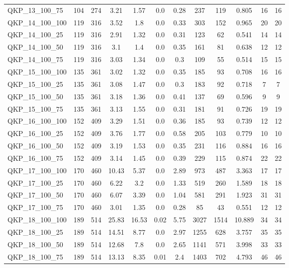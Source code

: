 \begin{table}[!h]
{\begin{tabular}{lccccccccccc}
QKP\_13\_100\_75 & 104 & 274 & 3.21 & 1.57 & 0.0 & 0.28 & 237 & 119 & 0.805 & 16 & 16\\
QKP\_14\_100\_100 & 119 & 316 & 3.52 & 1.8 & 0.0 & 0.33 & 303 & 152 & 0.965 & 20 & 20\\
QKP\_14\_100\_25 & 119 & 316 & 2.91 & 1.32 & 0.0 & 0.31 & 123 & 62 & 0.541 & 14 & 14\\
QKP\_14\_100\_50 & 119 & 316 & 3.1 & 1.4 & 0.0 & 0.35 & 161 & 81 & 0.638 & 12 & 12\\
QKP\_14\_100\_75 & 119 & 316 & 3.03 & 1.34 & 0.0 & 0.3 & 109 & 55 & 0.514 & 15 & 15\\
QKP\_15\_100\_100 & 135 & 361 & 3.02 & 1.32 & 0.0 & 0.35 & 185 & 93 & 0.708 & 16 & 16\\
QKP\_15\_100\_25 & 135 & 361 & 3.08 & 1.47 & 0.0 & 0.3 & 183 & 92 & 0.718 & 7 & 7\\
QKP\_15\_100\_50 & 135 & 361 & 3.18 & 1.36 & 0.0 & 0.41 & 137 & 69 & 0.596 & 9 & 9\\
QKP\_15\_100\_75 & 135 & 361 & 3.13 & 1.55 & 0.0 & 0.31 & 181 & 91 & 0.726 & 19 & 19\\
QKP\_16\_100\_100 & 152 & 409 & 3.29 & 1.51 & 0.0 & 0.36 & 185 & 93 & 0.739 & 12 & 12\\
QKP\_16\_100\_25 & 152 & 409 & 3.76 & 1.77 & 0.0 & 0.58 & 205 & 103 & 0.779 & 10 & 10\\
QKP\_16\_100\_50 & 152 & 409 & 3.19 & 1.53 & 0.0 & 0.35 & 231 & 116 & 0.884 & 16 & 16\\
QKP\_16\_100\_75 & 152 & 409 & 3.14 & 1.45 & 0.0 & 0.39 & 229 & 115 & 0.874 & 22 & 22\\
QKP\_17\_100\_100 & 170 & 460 & 10.43 & 5.37 & 0.0 & 2.89 & 973 & 487 & 3.363 & 17 & 17\\
QKP\_17\_100\_25 & 170 & 460 & 6.22 & 3.2 & 0.0 & 1.33 & 519 & 260 & 1.589 & 18 & 18\\
QKP\_17\_100\_50 & 170 & 460 & 6.07 & 3.39 & 0.0 & 1.04 & 581 & 291 & 1.923 & 31 & 31\\
QKP\_17\_100\_75 & 170 & 460 & 3.01 & 1.35 & 0.0 & 0.28 & 85 & 43 & 0.551 & 12 & 12\\
QKP\_18\_100\_100 & 189 & 514 & 25.83 & 16.53 & 0.02 & 5.75 & 3027 & 1514 & 10.889 & 34 & 34\\
QKP\_18\_100\_25 & 189 & 514 & 14.51 & 8.77 & 0.0 & 2.97 & 1255 & 628 & 3.757 & 35 & 35\\
QKP\_18\_100\_50 & 189 & 514 & 12.68 & 7.8 & 0.0 & 2.65 & 1141 & 571 & 3.998 & 33 & 33\\
QKP\_18\_100\_75 & 189 & 514 & 13.13 & 8.35 & 0.01 & 2.4 & 1403 & 702 & 4.793 & 46 & 46\\

\end{tabular}}
\end{table}
